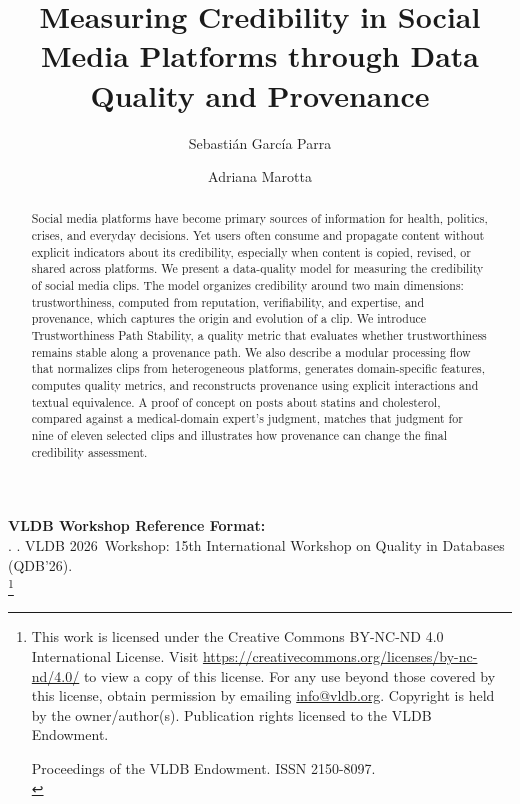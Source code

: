 \documentclass[sigconf, nonacm]{acmart}
\newcommand\vldbyear{2026}
\newcommand\vldbworkshop{15th International Workshop on Quality in Databases (QDB’26)}
\newcommand\vldbauthors{\authors}
\newcommand\vldbtitle{\shorttitle}
\newcommand\vldbpagestyle{plain}
\begin{document}
\title[Credibility Measurement in Social Media]{Measuring Credibility in Social Media Platforms through Data Quality and Provenance}

\author{Sebasti\'an Garc\'ia Parra}

\author{Adriana Marotta}

\begin{abstract}
Social media platforms have become primary sources of information for health,
politics, crises, and everyday decisions. Yet users often consume and propagate
content without explicit indicators about its credibility, especially when
content is copied, revised, or shared across platforms. We present a
data-quality model for measuring the credibility of social media clips. The model
organizes credibility around two main dimensions: trustworthiness, computed from
reputation, verifiability, and expertise, and provenance, which captures the
origin and evolution of a clip. We introduce Trustworthiness Path Stability, a
quality metric that evaluates whether trustworthiness remains stable along a
provenance path. We also describe a modular processing flow that normalizes clips
from heterogeneous platforms, generates domain-specific features, computes
quality metrics, and reconstructs provenance using explicit interactions and
textual equivalence. A proof of concept on posts about statins and cholesterol,
compared against a medical-domain expert's judgment, matches that judgment for
nine of eleven selected clips and illustrates how provenance can change the
final credibility assessment.
\end{abstract}

\maketitle

\pagestyle{\vldbpagestyle}
\begingroup\small\noindent\raggedright\textbf{VLDB Workshop Reference Format:}\\
\vldbauthors. \vldbtitle. VLDB \vldbyear\ Workshop: \vldbworkshop.\\
\endgroup
\begingroup
\renewcommand\thefootnote{}\footnote{\noindent
This work is licensed under the Creative Commons BY-NC-ND 4.0 International License. Visit \url{https://creativecommons.org/licenses/by-nc-nd/4.0/} to view a copy of this license. For any use beyond those covered by this license, obtain permission by emailing \href{mailto:info@vldb.org}{info@vldb.org}. Copyright is held by the owner/author(s). Publication rights licensed to the VLDB Endowment. \\
\raggedright Proceedings of the VLDB Endowment.
ISSN 2150-8097. \\
}\addtocounter{footnote}{-1}\endgroup
\end{document}
